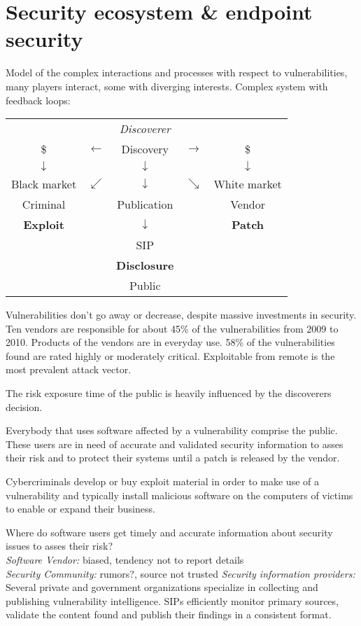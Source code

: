\section{Security ecosystem \& endpoint security}

 Model of the complex interactions and processes with respect to vulnerabilities, many players interact, some with diverging interests. Complex system with feedback loops:

\begin{tabular}{ccccc}
& & \textit{Discoverer} & & \\
\$ & $\leftarrow$ & Discovery & $\rightarrow$ & \$ \\
$\downarrow$ & & $\downarrow$ & & $\downarrow$ \\
Black market & $\swarrow$ & $\downarrow$ & $\searrow$ & White market \\
Criminal & & Publication & & Vendor \\
\textbf{Exploit} & & $\downarrow$ & & \textbf{Patch} \\
& & SIP & & \\
& & \textbf{Disclosure} & & \\
& & Public & & \\
\end{tabular}

 Vulnerabilities don't go away or decrease, despite massive investments in security. Ten vendors are responsible for about 45\% of the vulnerabilities from 2009 to 2010. Products of the vendors are in everyday use. 58\% of the vulnerabilities found are rated highly or moderately critical. Exploitable from remote is the most prevalent attack vector.

 The risk exposure time of the public is heavily influenced by the discoverers decision.

 Everybody that uses software affected by a vulnerability comprise the public. These users are in need of accurate and validated security information to asses their risk and to protect their systems until a patch is released by the vendor.

 Cybercriminals develop or buy exploit material in order to make use of a vulnerability and typically install malicious software on the computers of victims to enable or expand their business.

 Where do software users get timely and accurate information about security issues to asses their risk? \\
\emph{Software Vendor:} biased, tendency not to report details \\
\emph{Security Community:} rumors?, source not trusted
\emph{Security information providers:} Several private and government organizations specialize in collecting and publishing vulnerability intelligence. SIPs efficiently monitor primary sources, validate the content found and publish their findings in a consistent format.

